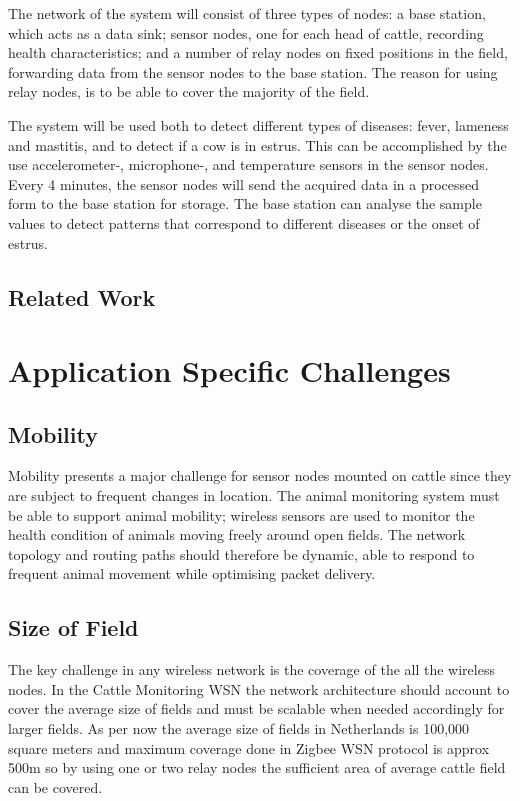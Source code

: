 \documentclass[conference]{IEEEtran}
\begin{document}
The network of the system will consist of three types of nodes: a base station,
which acts as a data sink; sensor nodes, one for each head of cattle, recording
health characteristics; and a number of relay nodes on fixed positions in the
field, forwarding data from the sensor nodes to the base station. The reason
for using relay nodes, is to be able to cover the majority of the field.

The system will be used both to detect different types of diseases: fever,
lameness and mastitis, and to detect if a cow is in estrus.  This can be
accomplished by the use accelerometer-, microphone-, and temperature sensors in
the sensor nodes.~\cite{hese2014}  Every 4 minutes, the sensor nodes will send the acquired
data in a processed form to the base station for storage. The base station can
analyse the sample values to detect patterns that correspond to different
diseases or the onset of estrus.

\subsection{Related Work}


\section{Application Specific Challenges}

\subsection{Mobility}

Mobility presents a major challenge for sensor nodes mounted on cattle since
they are subject to frequent changes in location.  The animal monitoring system
must be able to support animal mobility; wireless sensors are used to monitor
the health condition of animals moving freely around open fields. The network
topology and routing paths should therefore be dynamic, able to respond to
frequent animal movement while optimising packet delivery.

\subsection{Size of Field}

The key challenge in any wireless network is the coverage of the all the
wireless nodes. In the Cattle Monitoring WSN the network architecture should
account to cover the average size of fields and must be scalable when needed
accordingly for larger fields. As per now the average size of fields in
Netherlands is 100,000 square meters and maximum coverage done in Zigbee WSN
protocol is approx 500m so by using one or two relay nodes the sufficient area
of average cattle field can be covered.
\end{document}
